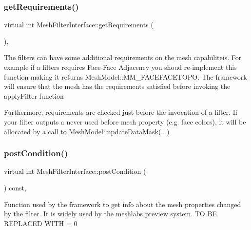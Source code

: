 \subsubsection{\texorpdfstring{get\+Requirements()}{getRequirements()}}
{\footnotesize\ttfamily virtual int Mesh\+Filter\+Interface\+::get\+Requirements (\begin{DoxyParamCaption}\item[{Q\+Action $\ast$}]{ }\end{DoxyParamCaption})\hspace{0.3cm}{\ttfamily [inline]}, {\ttfamily [virtual]}}

The filters can have some additional requirements on the mesh capabiliteis. For example if a filters requires Face-\/\+Face Adjacency you shoud re-\/implement this function making it returns Mesh\+Model\+::\+M\+M\+\_\+\+F\+A\+C\+E\+F\+A\+C\+E\+T\+O\+PO. The framework will ensure that the mesh has the requirements satisfied before invoking the apply\+Filter function

Furthermore, requirements are checked just before the invocation of a filter. If your filter outputs a never used before mesh property (e.\+g. face colors), it will be allocated by a call to Mesh\+Model\+::update\+Data\+Mask(...) \mbox{\label{class_mesh_filter_interface_a551a07190ee6f9333fdd94f0f38e417a}} 
\subsubsection{\texorpdfstring{post\+Condition()}{postCondition()}}
{\footnotesize\ttfamily virtual int Mesh\+Filter\+Interface\+::post\+Condition (\begin{DoxyParamCaption}\item[{Q\+Action $\ast$}]{ }\end{DoxyParamCaption}) const\hspace{0.3cm}{\ttfamily [inline]}, {\ttfamily [virtual]}}

Function used by the framework to get info about the mesh properties changed by the filter. It is widely used by the meshlab\textquotesingle{}s preview system. TO BE R\+E\+P\+L\+A\+C\+ED W\+I\+TH = 0 \mbox{\label{class_mesh_filter_interface_acbe7b0e88f3622b0faab5d16ab808148}} 
